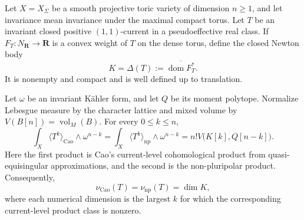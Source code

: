 \begin{theorem}
Let \(X=X_\Sigma\) be a smooth projective toric variety of dimension
\(n\geq1\), and let invariance mean invariance under the maximal compact
torus.  Let \(T\) be an invariant closed positive \((1,1)\)-current in a
pseudoeffective real class.  If \(F_T:N_{\mathbf R}\to\mathbf R\) is a
convex weight of \(T\) on the dense torus, define the closed Newton body
\[
                    K=\Delta(T):=
                    \overline{\operatorname{dom}F_T^*}.
\]
It is nonempty and compact and is well defined up to translation.

Let \(\omega\) be an invariant K\"ahler form, and let \(Q\) be its moment
polytope.  Normalize Lebesgue measure by the character lattice and mixed
volume by \(V(B[n])=\operatorname{vol}_M(B)\).  For every
\(0\leq k\leq n\),
\[
 \int_X\langle T^k\rangle_{\mathrm{Cao}}\wedge\omega^{n-k}
 =\int_X\langle T^k\rangle_{\mathrm{np}}\wedge\omega^{n-k}
 =n!V\bigl(K[k],Q[n-k]\bigr).
\]
Here the first product is Cao's current-level cohomological product from
quasi-equisingular approximations, and the second is the non-pluripolar
product.  Consequently,
\[
                    \nu_{\mathrm{Cao}}(T)
                    =\nu_{\mathrm{np}}(T)
                    =\dim K,
\]
where each numerical dimension is the largest \(k\) for which the
corresponding current-level product class is nonzero.
\end{theorem}

